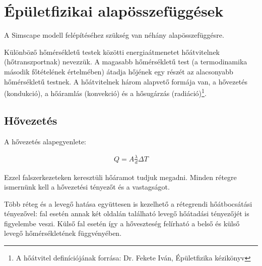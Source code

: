  


\section{Épületfizikai alapösszefüggések}
 
 A Simscape modell felépítéséhez szükség van néhány alapösszefüggésre.
 
 Különböző hőmérsékletű testek közötti energiaátmenetet hőátvitelnek
 (hőtranszportnak) nevezzük. A magasabb hőmérsékletű
 test (a termodinamika második főtételének értelmében) átadja hőjének
 egy részét az alacsonyabb hőmérsékletű testnek.
A hőátvitelnek három alapvető formája van, a hővezetés (kondukció), a hőáramlás (konvekció) és a hősugárzás (radiáció)\footnote{A hőátvitel definíciójának forrása: Dr. Fekete Iván, Épületfizika kézikönyv}.
 

\begin{table}[H]
	\footnotesize
	\centering
	\caption{Hőközlés fajtái}
	
	\label{tab:HeatExchangeTypes}
\end{table}

\subsection{Hővezetés}

A hővezetés alapegyenlete:

\begin{equation} \label{eq_hovezetes}
\begin{aligned}
Q = A \frac{\lambda}{d} \Delta T
\end{aligned}
\end{equation}

Ezzel falszerkezeteken keresztüli hőáramot tudjuk megadni. Minden rétegre ismernünk kell a hővezetési tényezőt és a vastagságot.

Több réteg és a levegő hatása együttesen is kezelhető a rétegrendi hőátbocsátási tényezővel: fal esetén annak két oldalán található levegő hőátadási tényezőjét is figyelembe veszi. Külső fal esetén így a hőveszteség felírható a belső és külső levegő hőmérsékletének függvényében. 

